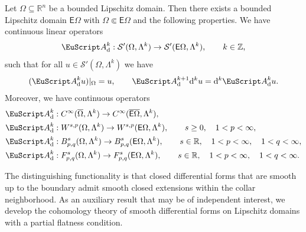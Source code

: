 \documentclass[10pt,a4paper]{amsart}
\theoremstyle{definition}
\theoremstyle{remark}
\numberwithin{equation}{section}
\newcommand{\bbR}{{\mathbb R}}
\newcommand{\bbZ}{{\mathbb Z}}
\newcommand{\calS}{{\mathcal S}}
\newcommand{\euA}{{\EuScript A}}
\newcommand{\sfE}{{\mathsf E}}
\newcommand{\closure}{\overline}
\renewcommand{\restriction}{|}
\newcommand{\cartan}{{\mathrm d}}
\newcommand{\Domain}{{\Omega}}
\newcommand{\extDomain}{{\sfE\Omega}}
\newcommand{\Alt}[1]{\Lambda^{#1}}
\newcommand{\kommErweiterung}{\euA_{\cartan}}
\newcommand{\Wint}{W}
\begin{document}
\begin{theorem}\label{introduction:theorem:commuting-universal-extension}
    Let $\Domain \subseteq \bbR^{n}$ be a bounded Lipschitz domain. 
    Then there exists a bounded Lipschitz domain $\extDomain$ with $\Domain \Subset \extDomain$ and the following properties.
    We have continuous linear operators 
    \begin{align}\label{introduction:math:commuting-universal-extension}
        \kommErweiterung^{k} : 
        \calS'(\Domain,\Alt{k})
        \to 
        \calS'(\extDomain,\Alt{k})
        ,
        \qquad 
        k \in \bbZ
        ,
    \end{align}
    such that for all $u \in \calS'(\Domain,\Alt{k})$ we have 
    \begin{align*}
        ( \kommErweiterung^{k} u) \restriction_{\Domain} = u,
        \qquad 
        \kommErweiterung^{k+1} \cartan^{k} u = \cartan^{k} \kommErweiterung^{k} u
        .
    \end{align*}
    Moreover, we have continuous operators 
    \begin{align}\label{introduction:math:commuting-universal-extension:smooth}
        &\kommErweiterung^{k} : C^{\infty}(\closure\Domain,\Alt{k}) \to C^{\infty}(\closure\extDomain,\Alt{k})
        ,
        \\
        &\kommErweiterung^{k} : \Wint^{s,p}(\Domain,\Alt{k}) \to \Wint^{s,p}(\extDomain,\Alt{k}), 
        \qquad 
        s \geq 0, \quad 1 < p < \infty
        ,
        \\
        &\kommErweiterung^{k} : B^{s}_{p,q}(\Domain,\Alt{k}) \to B^{s}_{p,q}(\extDomain,\Alt{k}),
        \qquad
        s \in \bbR, \quad 1 < p < \infty, \quad 1 < q < \infty
        ,
        \\
        &\kommErweiterung^{k} : F^{s}_{p,q}(\Domain,\Alt{k}) \to F^{s}_{p,q}(\extDomain,\Alt{k}),
        \qquad
        s \in \bbR, \quad 1 < p < \infty, \quad 1 < q < \infty
        .
    \end{align}
\end{theorem}

The distinguishing functionality is that closed differential forms that are smooth up to the boundary admit smooth closed extensions within the collar neighborhood. 
As an auxiliary result that may be of independent interest, we develop the cohomology theory of smooth differential forms on Lipschitz domains with a partial flatness condition. 
\end{document}
